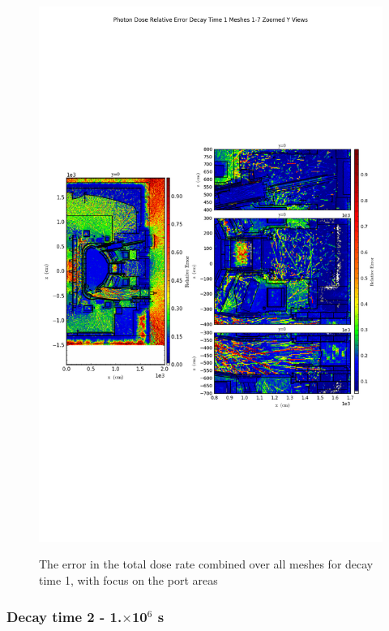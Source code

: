 \documentclass[12pt]{article}
\begin{document}
\begin{figure}[ht!]
\centering
\includegraphics[trim={0cm 9cm 0cm 10cm},clip,scale=0.75]{../plots/final_model/Photon_Dose_Relative_Error_Decay_Time_1_Meshes_1-7_Zoomed_Y_Views.png}
\label{fig:photons_dc1_b4c_total_error_zoomed}
\caption{The error in the total dose rate combined over all meshes for decay time 1, with focus on the port areas}
\end{figure}

\clearpage
\subsubsection{Decay time 2 - 1.$\times$10$^6$ s}
\end{document}
